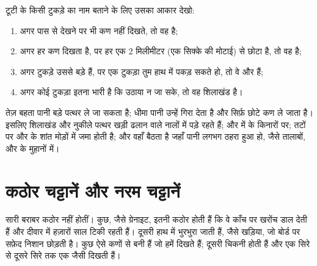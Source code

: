 \begin{method}[टूटी चट्टान को आकार के हिसाब से छाँटना]\label{met:g3:stones-pebbles-sand:sort}
टूटी  के किसी टुकड़े का नाम बताने के लिए उसका आकार देखो:
\begin{enumerate}
  \item अगर पास से देखने पर भी कण नहीं दिखते, तो वह  है;
  \item अगर हर कण दिखता है, पर हर एक 2 मिलीमीटर (एक सिक्के की मोटाई) से
        छोटा है, तो वह  है;
  \item अगर टुकड़े उससे बड़े हैं, पर एक टुकड़ा तुम हाथ में पकड़ सकते हो, तो वे
         और  हैं;
  \item अगर कोई टुकड़ा इतना भारी है कि उठाया न जा सके, तो वह शिलाखंड है।
\end{enumerate}
\end{method}

\begin{example}[हर आकार कहाँ मिलता है?]\label{ex:g3:stones-pebbles-sand:where}
तेज़ बहता पानी बड़े पत्थर ले जा सकता है; धीमा पानी उन्हें गिरा देता है और
सिर्फ़ छोटे कण ले जाता है। इसलिए शिलाखंड और नुकीले पत्थर खड़ी ढलान वाले
 नालों में पड़े रहते हैं;  और   में  के किनारों पर;
  तटों पर और  के शांत मोड़ों में जमा होती है; और  वहाँ बैठता
है जहाँ पानी लगभग ठहरा हुआ हो, जैसे तालाबों,  और  के मुहानों में।
\end{example}

\section{कठोर चट्टानें और नरम चट्टानें}

सारी  बराबर कठोर नहीं होतीं। कुछ, जैसे ग्रेनाइट, इतनी कठोर होती हैं
कि वे काँच पर खरोंच डाल देती हैं और दीवार में हज़ारों साल टिकी रहती हैं।
दूसरी हाथ में भुरभुरा जाती हैं, जैसे खड़िया, जो बोर्ड पर सफ़ेद निशान छोड़ती
है। कुछ  ऐसे कणों से बनी हैं जो हमें दिखते हैं; दूसरी चिकनी होती हैं
और एक सिरे से दूसरे सिरे तक एक जैसी दिखती हैं।

